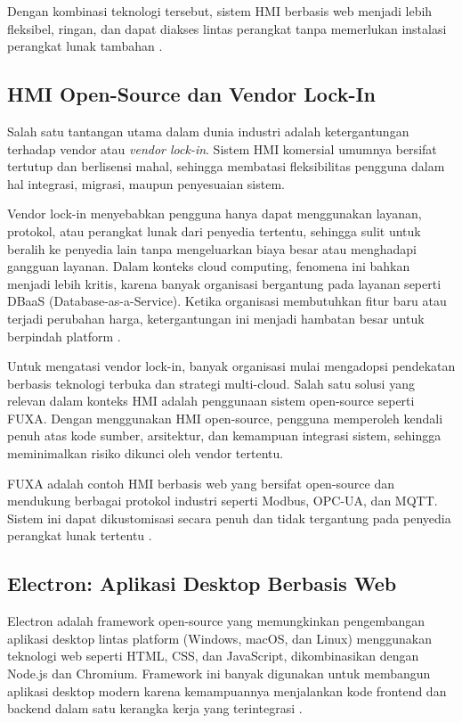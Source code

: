 Dengan kombinasi teknologi tersebut, sistem HMI berbasis web menjadi lebih fleksibel, ringan, dan dapat diakses lintas perangkat tanpa memerlukan instalasi perangkat lunak tambahan \parencite{seeed2024fuxa}.

\subsection{HMI Open-Source dan Vendor Lock-In}
Salah satu tantangan utama dalam dunia industri adalah ketergantungan terhadap vendor atau \textit{vendor lock-in}. Sistem HMI komersial umumnya bersifat tertutup dan berlisensi mahal, sehingga membatasi fleksibilitas pengguna dalam hal integrasi, migrasi, maupun penyesuaian sistem.

Vendor lock-in menyebabkan pengguna hanya dapat menggunakan layanan, protokol, atau perangkat lunak dari penyedia tertentu, sehingga sulit untuk beralih ke penyedia lain tanpa mengeluarkan biaya besar atau menghadapi gangguan layanan. Dalam konteks cloud computing, fenomena ini bahkan menjadi lebih kritis, karena banyak organisasi bergantung pada layanan seperti DBaaS (Database-as-a-Service). Ketika organisasi membutuhkan fitur baru atau terjadi perubahan harga, ketergantungan ini menjadi hambatan besar untuk berpindah platform \parencite{banthia2024vendorlockin}.

Untuk mengatasi vendor lock-in, banyak organisasi mulai mengadopsi pendekatan berbasis teknologi terbuka dan strategi multi-cloud. Salah satu solusi yang relevan dalam konteks HMI adalah penggunaan sistem open-source seperti FUXA. Dengan menggunakan HMI open-source, pengguna memperoleh kendali penuh atas kode sumber, arsitektur, dan kemampuan integrasi sistem, sehingga meminimalkan risiko dikunci oleh vendor tertentu.

FUXA adalah contoh HMI berbasis web yang bersifat open-source dan mendukung berbagai protokol industri seperti Modbus, OPC-UA, dan MQTT. Sistem ini dapat dikustomisasi secara penuh dan tidak tergantung pada penyedia perangkat lunak tertentu \parencite{seeed2024fuxa}.

\subsection{Electron: Aplikasi Desktop Berbasis Web}
Electron adalah framework open-source yang memungkinkan pengembangan aplikasi desktop lintas platform (Windows, macOS, dan Linux) menggunakan teknologi web seperti HTML, CSS, dan JavaScript, dikombinasikan dengan Node.js dan Chromium. Framework ini banyak digunakan untuk membangun aplikasi desktop modern karena kemampuannya menjalankan kode frontend dan backend dalam satu kerangka kerja yang terintegrasi \parencite{electron2024why}.

